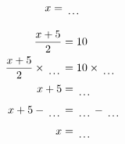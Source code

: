 \documentclass[12pt]{article}
\newcounter{minipagecount}
\begin{document}
\begin{multicols}{2}
\begin{minipage}[t]{0.45\textwidth}
\begin{align*}
        x &= \dotuline{\hspace{5mm}}\\
    \end{align*}
\end{minipage} %
\noindent{(\theminipagecount)}\hspace{0.1mm} %
\begin{minipage}[t]{0.45\textwidth} %
    \vspace{-26pt}  %
    \raggedright %
    \begin{align*} %
        \frac{x + 5}{2} &= 10\\
        \frac{x + 5}{2} \times\dotuline{\hspace{5mm}} &= 10 \times\dotuline{\hspace{5mm}}\\
        x + 5 &= \dotuline{\hspace{5mm}}\\
        x + 5 - \dotuline{\hspace{5mm}} &= \dotuline{\hspace{5mm}} - \dotuline{\hspace{5mm}}\\
        x &= \dotuline{\hspace{5mm}}\\
    \end{align*}
\end{minipage}\newpage
\noindent{(\theminipagecount)}\hspace{0.1mm} %
\begin{minipage}[t]{0.45\textwidth} %
    \vspace{-26pt}  %

\end{minipage}
\end{multicols}
\end{document}
